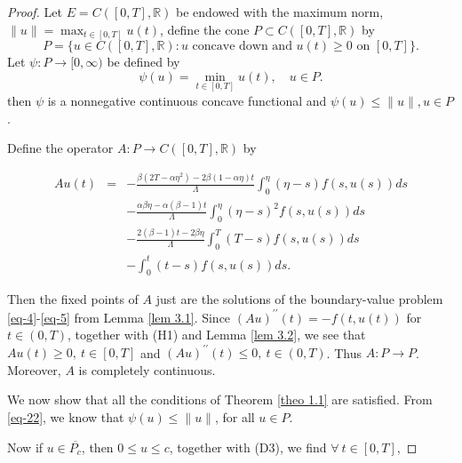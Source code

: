 \documentclass[reqno]{amsart}\usepackage{amsmath}
\begin{document}
\begin{proof}


Let $E = C([0, T], \mathbb{R})$ be endowed with the maximum norm, $\|u\|=\max_{t\in[0, T]} u(t)$, define the cone $P\subset C([0, T], \mathbb{R})$ by
\begin{equation}
P=\{u\in C([0, T], \mathbb{R}) : u \text{ concave down and }
u(t)\ge 0 \text{ on } [0, T]\}.  \label{eq-21}
\end{equation}
Let $\psi:P\to [0,\infty)$ be defined by
\begin{equation}
\psi(u)=\min_{t\in[0, T]} u(t),\quad u\in P. \label{eq-22}
\end{equation}
then $\psi$ is a nonnegative continuous concave functional and
$\psi(u)\le\|u\|, u\in P$.


Define the operator $A: P\to C([0, T], \mathbb{R})$ by

\begin{eqnarray*}
Au(t)&=&-\frac{\beta (2T-\alpha \eta ^{2})-2\beta (1-\alpha \eta
)t}{\Lambda}\int_{0}^{\eta }(\eta -s)f(s, u(s))ds \\
&&-\frac{\alpha \beta \eta -\alpha (\beta -1)t}{\Lambda}\int_{0}^{\eta }(\eta -s)^{2}f(s, u(s))ds \\
&&-\frac{2(\beta-1)t-2\beta \eta }{\Lambda}\int_{0}^{T}(T-s)f(s, u(s))ds \\
&&-\int_{0}^{t}(t-s)f(s, u(s))ds.
\end{eqnarray*}



Then the fixed points of $A$ just are the solutions of the
boundary-value problem \eqref{eq-4}-\eqref{eq-5} from Lemma
\ref{lem 3.1}. Since $(Au)^{\prime \prime }(t)=-f(t,  u(t))$ for $t\in
(0, T)$, together with {\rm (H1)} and Lemma \ref{lem 3.2}, we see that
$Au(t)\ge 0,\ t\in [0, T]$ and $(Au)^{\prime \prime }(t)\le 0,\
t\in(0, T)$. Thus $A:P\to P$. Moreover, $A$ is completely
continuous.

We now show that all the conditions of Theorem \ref{theo 1.1} are satisfied. From
\eqref{eq-22}, we know that $\psi(u)\le\|u\|$, for all $u\in P$.

Now if $u\in\overline {P_c}$, then $0\le u\le c$, together with {\rm (D3)},
we find $\forall\ t\in[0, T]$,



\end{proof}
\end{document}
